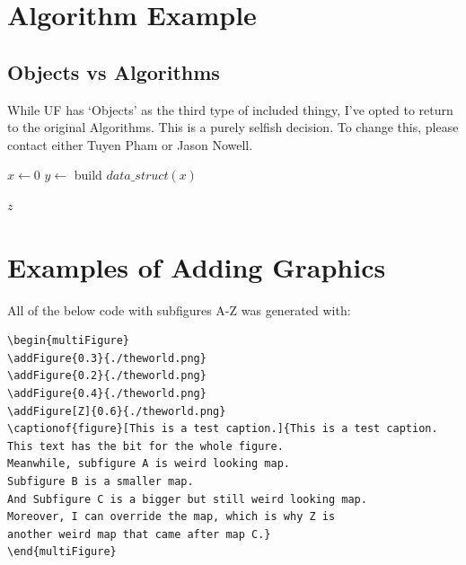 \documentclass[../main.tex]{subfiles}
\begin{document}
\section{Algorithm Example}

\subsection{Objects vs Algorithms}
While UF has `Objects' as the third type of included thingy, I've opted to return to the original Algorithms. This is a purely selfish decision. To change this, please contact either Tuyen Pham or Jason Nowell.

\begin{algorithm}[H]
\caption[short example algo, short caption]{example of algorithm env}

$x \gets 0$\;
$y \gets$ build $data\_struct(x)$ \label{line:struct}\;


\Return $z$\;
\end{algorithm}

\section{Examples of Adding Graphics}
\label{Sec:addingGraphics}
All of the below code with subfigures A-Z was generated with:
\begin{verbatim}
\begin{multiFigure}
\addFigure{0.3}{./theworld.png}
\addFigure{0.2}{./theworld.png}
\addFigure{0.4}{./theworld.png}
\addFigure[Z]{0.6}{./theworld.png}
\captionof{figure}[This is a test caption.]{This is a test caption. 
This text has the bit for the whole figure. 
Meanwhile, subfigure A is weird looking map. 
Subfigure B is a smaller map. 
And Subfigure C is a bigger but still weird looking map. 
Moreover, I can override the map, which is why Z is 
another weird map that came after map C.}
\end{multiFigure}
\end{verbatim}
\end{document}
